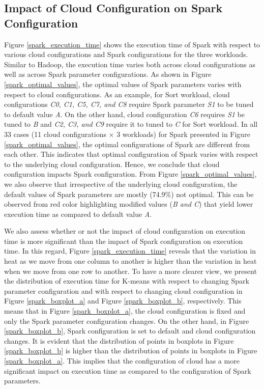 \documentclass[3p]{elsarticle}
\begin{document}
\subsection{Impact of Cloud Configuration on Spark Configuration}

Figure \ref{spark_execution_time} shows the execution time of Spark with respect to various cloud configurations and Spark configurations for the three workloads. Similar to Hadoop, the execution time varies both across cloud configurations as well as across Spark parameter configurations. As shown in Figure \ref{spark_optimal_values}, the optimal values of Spark parameters varies with respect to cloud configurations. As an example, for Sort workload, cloud configurations \textit{C0, C1, C5, C7, and C8} require Spark parameter \textit{S1} to be tuned to default value \textit{A}. On the other hand, cloud configuration \textit{C6} requires \textit{S1} be tuned to \textit{B} and \textit{C2, C3, and C9} require it to tuned to \textit{C} for Sort workload. In all 33 cases (11 cloud configurations $\times$ 3 workloads) for Spark presented in Figure \ref{spark_optimal_values}, the optimal configurations of Spark are different from each other. This indicates that optimal configuration of Spark varies with respect to the underlying cloud configuration. Hence, we conclude that cloud configuration impacts Spark configuration. From Figure \ref{spark_optimal_values}, we also observe that irrespective of the underlying cloud configuration, the default values of Spark parameters are mostly (74.9\%) not optimal. This can be observed from red color highlighting modified values (\textit{B and C}) that yield lower execution time as compared to default value \textit{A}.


We also assess whether or not the impact of cloud configuration on execution time is more significant than the impact of Spark configuration on execution time. In this regard, Figure \ref{spark_execution_time} reveals that the variation in heat as we move from one column to another is higher than the variation in heat when we move from one row to another. To have a more clearer view, we present the distribution of execution time for K-means with respect to changing Spark parameter configuration and with respect to changing cloud configuration in Figure \ref{spark_boxplot_a} and Figure \ref{spark_boxplot_b}, respectively. This means that in Figure \ref{spark_boxplot_a}, the cloud configuration is fixed and only the Spark parameter configuration changes. On the other hand, in Figure \ref{spark_boxplot_b}, Spark configuration is set to default and cloud configuration changes. It is evident that the distribution of points in boxplots in Figure \ref{spark_boxplot_b} is higher than the distribution of points in boxplots in Figure \ref{spark_boxplot_a}. This implies that the configuration of cloud has a more significant impact on execution time as compared to the configuration of Spark parameters. 
\end{document}
